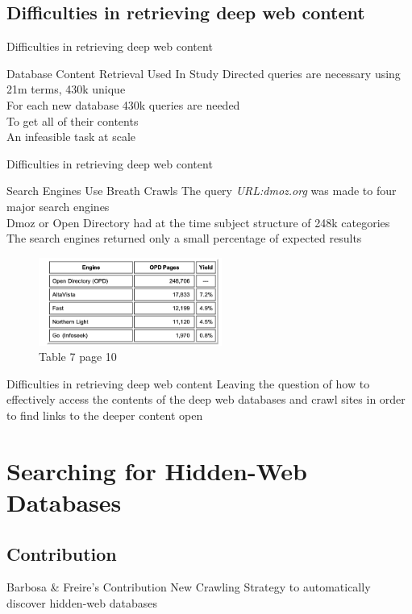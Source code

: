 \documentclass{beamer}
\begin{document}
\subsection{Difficulties in retrieving deep web content }
\begin{frame}[fragile]{Difficulties in retrieving deep web content }
\begin{block}{Database Content Retrieval Used In Study}
Directed queries are necessary 
using 21m terms, 430k unique \\
For each new database 430k queries are needed \\
To get all of their contents \\
An infeasible task at scale
\end{block}

\end{frame}
\begin{frame}[fragile]{Difficulties in retrieving deep web content }
\begin{block}{Search Engines Use Breath Crawls}
The query  \emph{URL:dmoz.org} was made to four major search engines \\
Dmoz or Open Directory had at the time subject structure of 248k categories \\
The search engines returned only a small percentage of expected results
\end{block}
\begin{figure}
			\includegraphics[width=6cm]{dwII.png}
			\caption{Table 7 page 10}
		\end{figure}
\end{frame}
\begin{frame}[fragile]{Difficulties in retrieving deep web content }
Leaving the question of how to effectively access the contents of the deep 
web databases and crawl sites in order to find links to the deeper content open
\end{frame}
\section{Searching for Hidden-Web Databases}
\subsection{Contribution}
\begin{frame}{ Barbosa \&  Freire's Contribution}
New Crawling Strategy to automatically discover hidden-web databases
\end{frame}
\end{document}
